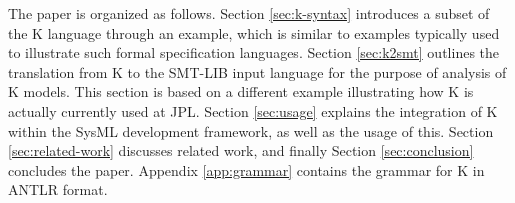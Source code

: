 The paper is organized as follows. Section \ref{sec:k-syntax}
introduces a subset of the K language through an example, which is
similar to examples typically used to illustrate such formal
specification languages. Section \ref{sec:k2smt} outlines the
translation from K to the SMT-LIB input language for the purpose of
analysis of K models. This section is based on a different example
illustrating how K is actually currently used at JPL. Section
\ref{sec:usage} explains the integration of K within the SysML
development framework, as well as the usage of this. Section
\ref{sec:related-work} discusses related work, and finally Section
\ref{sec:conclusion} concludes the paper. Appendix \ref{app:grammar}
contains the grammar for K in ANTLR \cite{antlr} format.
